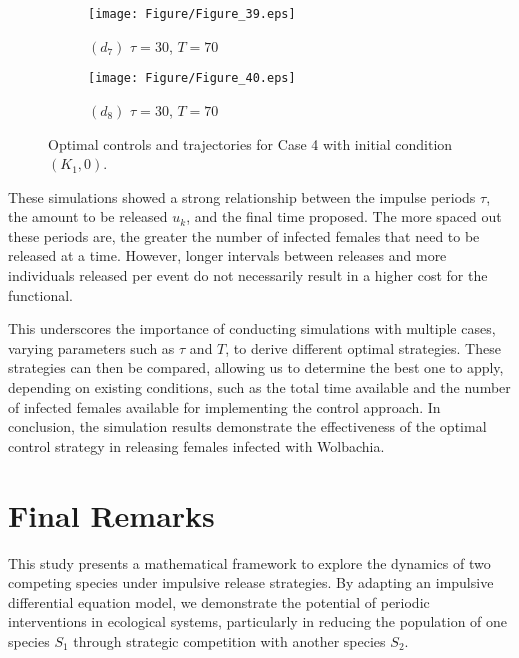 \documentclass[10pt,letterpaper]{article}
\begin{document}
\begin{figure}[H]
    \begin{subfigure}[t]{0.48\textwidth}
        \centering
        \texttt{[image: Figure/Figure\_39.eps]}
        \par \vspace{1pt} $(d_7)$ $\tau = 30$, $T = 70$
    \end{subfigure}
    \hfill
    \begin{subfigure}[t]{0.48\textwidth}
        \centering
        \texttt{[image: Figure/Figure\_40.eps]}
        \par \vspace{1pt} $(d_8)$ $\tau = 30$, $T = 70$
    \end{subfigure}

    \hspace{1pt}\caption{Optimal controls and trajectories for Case 4 with initial condition $(K_1,0)$.}
    \label{fig:8}
\end{figure}

These simulations showed a strong relationship between the impulse periods $\tau$, the amount to be released $u_k$, and the final time proposed. The more spaced out these periods are, the greater the number of infected females that need to be released at a time. However, longer intervals between releases and more individuals released per event do not necessarily result in a higher cost for the functional.

This underscores the importance of conducting simulations with multiple cases, varying parameters such as $\tau$ and $T$, to derive different optimal strategies. These strategies can then be compared, allowing us to determine the best one to apply, depending on existing conditions, such as the total time available and the number of infected females available for implementing the control approach. In conclusion, the simulation results demonstrate the effectiveness of the optimal control strategy in releasing females infected with Wolbachia. 

\section{Final Remarks}
\label{sec:conclusions}
This study presents a mathematical framework to explore the dynamics of two competing species under impulsive release strategies. By adapting an impulsive differential equation model, we demonstrate the potential of periodic interventions in ecological systems, particularly in reducing the population of one species $S_1$ through strategic competition with another species $S_2$.
\end{document}
